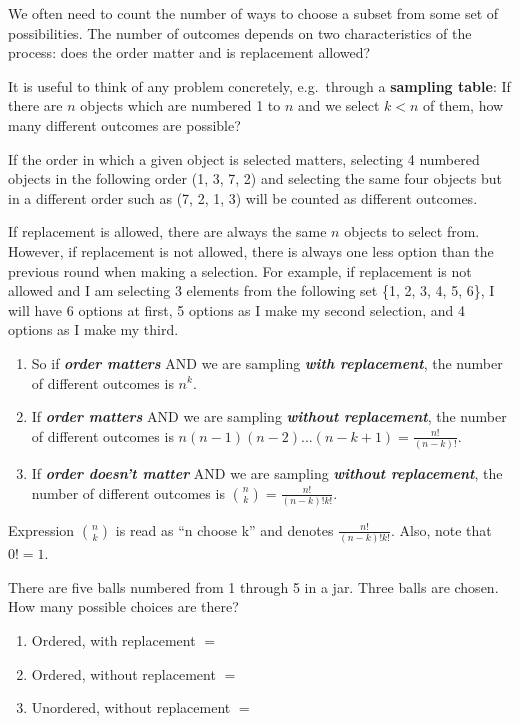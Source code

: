 \documentclass[
]{book}
\begin{document}
We often need to count the number of ways to choose a subset from some set of possibilities. The number of outcomes depends on two characteristics of the process: does the order matter and is replacement allowed?

It is useful to think of any problem concretely, e.g.~through a \textbf{sampling table}: If there are \(n\) objects which are numbered 1 to \(n\) and we select \(k < n\) of them, how many different outcomes are possible?

If the order in which a given object is selected matters, selecting 4 numbered objects in the following order (1, 3, 7, 2) and selecting the same four objects but in a different order such as (7, 2, 1, 3) will be counted as different outcomes.

If replacement is allowed, there are always the same \(n\) objects to select from. However, if replacement is not allowed, there is always one less option than the previous round when making a selection. For example, if replacement is not allowed and I am selecting 3 elements from the following set \{1, 2, 3, 4, 5, 6\}, I will have 6 options at first, 5 options as I make my second selection, and 4 options as I make my third.

\begin{enumerate}
\def\labelenumi{\arabic{enumi}.}
\item
  So if \textbf{\emph{order matters}} AND we are sampling \textbf{\emph{with replacement}}, the number of different outcomes is \(n^k\).
\item
  If \textbf{\emph{order matters}} AND we are sampling \textbf{\emph{without replacement}}, the number of different outcomes is \(n(n-1)(n-2)...(n-k+1)=\frac{n!}{(n-k)!}\).
\item
  If \textbf{\emph{order doesn't matter}} AND we are sampling \textbf{\emph{without replacement}}, the number of different outcomes is \(\binom{n}{k} = \frac{n!}{(n-k)!k!}\).
\end{enumerate}

Expression \(\binom{n}{k}\) is read as ``n choose k'' and denotes \(\frac{n!}{(n-k)!k!}\). Also, note that \(0! = 1\).

\begin{example}[Counting]
\protect\hypertarget{exm:counting}{}\label{exm:counting}

There are five balls numbered from 1 through 5 in a jar. Three balls are chosen. How many possible choices are there?

\begin{enumerate}
\def\labelenumi{\arabic{enumi}.}
\item
  Ordered, with replacement \(=\)
\item
  Ordered, without replacement \(=\)
\item
  Unordered, without replacement \(=\)
\end{enumerate}

\end{example}
\end{document}
